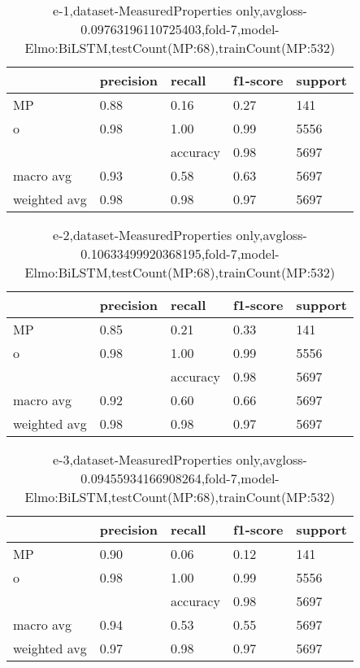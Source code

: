 \begin{table}[!ht] 
\centering
\caption{e-1,dataset-MeasuredProperties only,avgloss-0.09763196110725403,fold-7,model-Elmo:BiLSTM,testCount(MP:68),trainCount(MP:532)}\label{e-1data-mpS.tsv}
\begin{tabularx}{300pt}{|X|X|X|X|X|}
\hline
&precision&recall&f1-score&support\\
\hline
MP&0.88&0.16&0.27&141\\
\hline
o&0.98&1.00&0.99&5556\\
\hline
&&accuracy&0.98&5697\\
\hline
macro avg&0.93&0.58&0.63&5697\\
\hline
weighted avg&0.98&0.98&0.97&5697\\
\hline
\end{tabularx}
\end{table}
\begin{table}[!ht] 
\centering
\caption{e-2,dataset-MeasuredProperties only,avgloss-0.10633499920368195,fold-7,model-Elmo:BiLSTM,testCount(MP:68),trainCount(MP:532)}\label{e-2data-mpS.tsv}
\begin{tabularx}{300pt}{|X|X|X|X|X|}
\hline
&precision&recall&f1-score&support\\
\hline
MP&0.85&0.21&0.33&141\\
\hline
o&0.98&1.00&0.99&5556\\
\hline
&&accuracy&0.98&5697\\
\hline
macro avg&0.92&0.60&0.66&5697\\
\hline
weighted avg&0.98&0.98&0.97&5697\\
\hline
\end{tabularx}
\end{table}
\begin{table}[!ht] 
\centering
\caption{e-3,dataset-MeasuredProperties only,avgloss-0.09455934166908264,fold-7,model-Elmo:BiLSTM,testCount(MP:68),trainCount(MP:532)}\label{e-3data-mpS.tsv}
\begin{tabularx}{300pt}{|X|X|X|X|X|}
\hline
&precision&recall&f1-score&support\\
\hline
MP&0.90&0.06&0.12&141\\
\hline
o&0.98&1.00&0.99&5556\\
\hline
&&accuracy&0.98&5697\\
\hline
macro avg&0.94&0.53&0.55&5697\\
\hline
weighted avg&0.97&0.98&0.97&5697\\
\hline
\end{tabularx}
\end{table}
